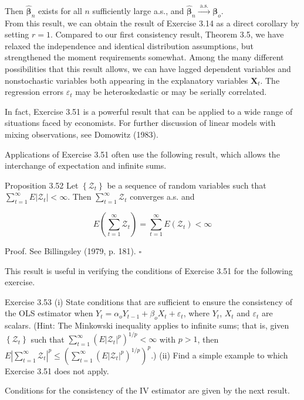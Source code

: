 \documentclass[10pt]{article}
\begin{document}
Then $\hat{\boldsymbol{\beta}}_{n}$ exists for all $n$ sufficiently large a.s., and $\hat{\boldsymbol{\beta}}_{n} \xrightarrow{\text { a.s. }} \boldsymbol{\beta}_{o}$.\\
From this result, we can obtain the result of Exercise 3.14 as a direct corollary by setting $r=1$. Compared to our first consistency result, Theorem 3.5, we have relaxed the independence and identical distribution assumptions, but strengthened the moment requirements somewhat. Among the many different possibilities that this result allows, we can have lagged dependent variables and nonstochastic variables both appearing in the explanatory variables $\mathbf{X}_{t}$. The regression errors $\varepsilon_{t}$ may be heteroskedastic or may be serially correlated.

In fact, Exercise 3.51 is a powerful result that can be applied to a wide range of situations faced by economists. For further discussion of linear models with mixing observations, see Domowitz (1983).

Applications of Exercise 3.51 often use the following result, which allows the interchange of expectation and infinite sums.

Proposition 3.52 Let $\left\{\mathcal{Z}_{t}\right\}$ be a sequence of random variables such that $\sum_{t=1}^{\infty} E\left|\mathcal{Z}_{t}\right|<\infty$. Then $\sum_{t=1}^{\infty} \mathcal{Z}_{t}$ converges a.s. and

$$
E\left(\sum_{t=1}^{\infty} \mathcal{Z}_{t}\right)=\sum_{t=1}^{\infty} E\left(\mathcal{Z}_{t}\right)<\infty
$$

Proof. See Billingsley (1979, p. 181). \(\square\)

This result is useful in verifying the conditions of Exercise 3.51 for the following exercise.

Exercise 3.53 (i) State conditions that are sufficient to ensure the consistency of the OLS estimator when $Y_{t}=\alpha_{o} Y_{t-1}+\beta_{o} X_{t}+\varepsilon_{t}$, where $Y_{t}$, $X_{t}$ and $\varepsilon_{t}$ are scalars. (Hint: The Minkowski inequality applies to infinite sums; that is, given $\left\{\mathcal{Z}_{t}\right\}$ such that $\sum_{t=1}^{\infty}\left(E\left|\mathcal{Z}_{t}\right|^{p}\right)^{1 / p}<\infty$ with $p>1$, then $E\left|\sum_{t=1}^{\infty} \mathcal{Z}_{t}\right|^{p} \leq\left(\sum_{t=1}^{\infty}\left(E\left|\mathcal{Z}_{t}\right|^{p}\right)^{1 / p}\right)^{p}$.) (ii) Find a simple example to which Exercise 3.51 does not apply.

Conditions for the consistency of the IV estimator are given by the next result.
\end{document}
